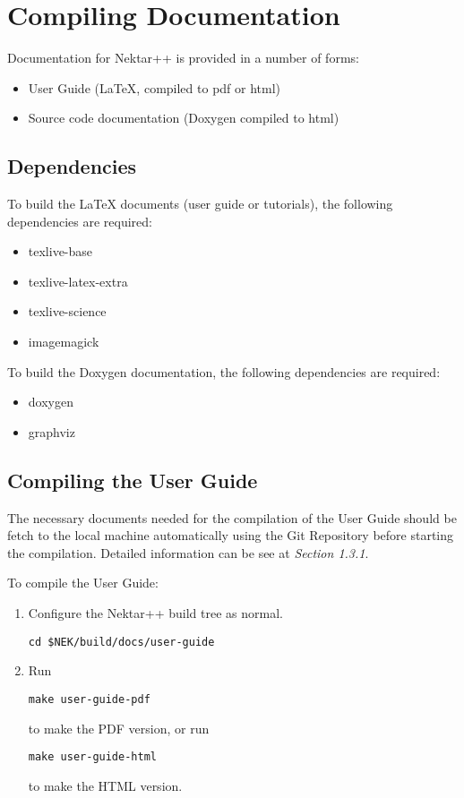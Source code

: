 \section{Compiling Documentation}
Documentation for Nektar++ is provided in a number of forms:
\begin{itemize}
\item User Guide (LaTeX, compiled to pdf or html)
\item Source code documentation (Doxygen compiled to html)
\end{itemize}

\subsection{Dependencies}
To build the LaTeX documents (user guide or tutorials), the following
dependencies are required:
\begin{itemize}
\item texlive-base
\item texlive-latex-extra
\item texlive-science
\item imagemagick
\end{itemize}

To build the Doxygen documentation, the following dependencies are required:
\begin{itemize}
\item doxygen
\item graphviz
\end{itemize}

\subsection{Compiling the User Guide}
The necessary documents needed for the compilation of the User Guide should be fetch to the local machine automatically using the Git Repository before starting the compilation. Detailed information can be see at \emph{Section 1.3.1}.

To compile the User Guide:
\begin{enumerate}
\item Configure the Nektar++ build tree as normal.
    \begin{lstlisting}[style=BashInputStyle]
cd $NEK/build/docs/user-guide
\end{lstlisting}
\item Run
    \begin{lstlisting}[style=BashInputStyle]
make user-guide-pdf
\end{lstlisting}
to make the PDF version, or run
\begin{lstlisting}[style=BashInputStyle]
make user-guide-html
\end{lstlisting}
to make the HTML version.
\end{enumerate}


